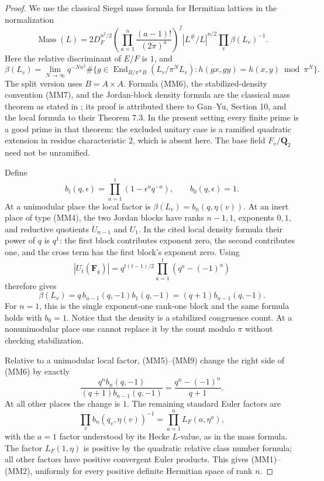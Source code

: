 \begin{proof}
We use the classical Siegel mass formula for Hermitian lattices
in the normalization
\[
 \operatorname{Mass}(L)=
 2D_F^{n^2/2}
 \left(\prod_{a=1}^{n}\frac{(a-1)!}{(2\pi)^a}\right)^f
 |L^\#/L|^{n/2}\prod_v\beta(L_v)^{-1}.
 \tag{MM6}
\]
Here the relative discriminant of \(E/F\) is \(1\), and
\[
 \beta(L_v)=
 \lim_{N\longrightarrow\infty}
 q^{-Nn^2}
 \#\{g\in\operatorname{End}_{B/\pi^N B}(L_v/\pi^NL_v):
                    h(gx,gy)=h(x,y)\bmod\pi^N\}.
 \tag{MM7}
\]
The split version uses \(B=A\times A\).  Formula (MM6), the
stabilized-density convention (MM7), and the Jordan-block density
formula are the classical mass theorem as stated in
\cite[Theorems 4.2.3--4.2.4 and Lemma 4.2.5]{kirschmer-herm};
its proof is attributed
there to Gan--Yu, Section 10, and the local formula to their
Theorem 7.3.  In the present setting every finite prime is a good
prime in that theorem: the excluded unitary case is a ramified
quadratic extension in residue characteristic \(2\), which is
absent here.  The base field \(F_v/\mathbf Q_2\) need not be
unramified.

Define
\[
 b_t(q,\epsilon)=\prod_{a=1}^{t}(1-\epsilon^a q^{-a}),
 \qquad b_0(q,\epsilon)=1.
 \tag{MM8}
\]
At a unimodular place the local factor is
\(\beta(L_v)=b_n(q,\eta(v))\).  At an inert place of type (MM4),
the two Jordan blocks have ranks \(n-1,1\), exponents \(0,1\),
and reductive quotients \(U_{n-1}\) and \(U_1\).  In the cited
local density formula their power of \(q\) is \(q^1\): the first
block contributes exponent zero, the second contributes one,
and the cross term has the first block's exponent zero.  Using
\[
 |U_t(\mathbf F_q)|
   =q^{t(t-1)/2}\prod_{a=1}^{t}(q^a-(-1)^a)
\]
therefore gives
\[
 \beta(L_v)
 =q\,b_{n-1}(q,-1)b_1(q,-1)
 =(q+1)b_{n-1}(q,-1).
 \tag{MM9}
\]
For \(n=1\), this is the single exponent-one rank-one block and
the same formula holds with \(b_0=1\).  Notice that the density
is a stabilized congruence count.  At a nonunimodular place one
cannot replace it by the count modulo \(\pi\) without checking
stabilization.

Relative to a unimodular local factor, (MM5)--(MM9) change the
right side of (MM6) by exactly
\[
 \frac{q^n b_n(q,-1)}{(q+1)b_{n-1}(q,-1)}
                =\frac{q^n-(-1)^n}{q+1}.
 \tag{MM10}
\]
At all other places the change is \(1\).  The remaining standard
Euler factors are
\[
 \prod_v b_n(q_v,\eta(v))^{-1}
                    =\prod_{a=1}^{n}L_F(a,\eta^a),
\]
with the \(a=1\) factor understood by its Hecke \(L\)-value, as
in the mass formula.  The factor \(L_F(1,\eta)\) is positive
by the quadratic relative class number formula; all other
factors have positive convergent Euler products.  This gives
(MM1)--(MM2), uniformly for every positive definite Hermitian
space of rank \(n\).
\end{proof}

